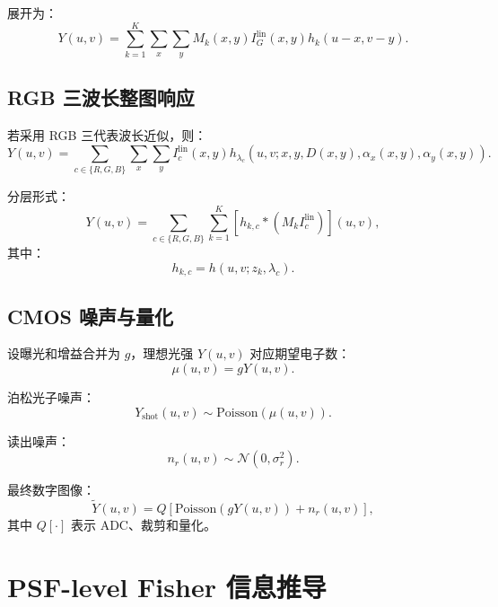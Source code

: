\documentclass[11pt,a4paper,fontset=none]{ctexart}
\begin{document}
展开为：
\begin{equation}
\boxed{
  Y(u,v)
  =
  \sum_{k=1}^{K}
  \sum_x\sum_y
  M_k(x,y)
  I_G^{\mathrm{lin}}(x,y)
  h_k(u-x,v-y).
}
\end{equation}

\subsection{RGB 三波长整图响应}

若采用 RGB 三代表波长近似，则：
\begin{equation}
  Y(u,v)
  =
  \sum_{c\in\{R,G,B\}}
  \sum_x\sum_y
  I_c^{\mathrm{lin}}(x,y)
  h_{\lambda_c}
  \left(
  u,v;
  x,y,
  D(x,y),
  \alpha_x(x,y),
  \alpha_y(x,y)
  \right).
\end{equation}

分层形式：
\begin{equation}
  Y(u,v)
  =
  \sum_{c\in\{R,G,B\}}
  \sum_{k=1}^{K}
  \left[
  h_{k,c}*
  \left(
  M_k I_c^{\mathrm{lin}}
  \right)
  \right](u,v),
\end{equation}
其中：
\begin{equation}
  h_{k,c}=h(u,v;z_k,\lambda_c).
\end{equation}

\subsection{CMOS 噪声与量化}

设曝光和增益合并为 $g$，理想光强 $Y(u,v)$ 对应期望电子数：
\begin{equation}
  \mu(u,v)=gY(u,v).
\end{equation}

泊松光子噪声：
\begin{equation}
  Y_{\mathrm{shot}}(u,v)\sim
  \mathrm{Poisson}(\mu(u,v)).
\end{equation}

读出噪声：
\begin{equation}
  n_r(u,v)\sim \mathcal N(0,\sigma_r^2).
\end{equation}

最终数字图像：
\begin{equation}
  \tilde Y(u,v)
  =
  Q\left[
  \mathrm{Poisson}(gY(u,v))+n_r(u,v)
  \right],
\end{equation}
其中 $Q[\cdot]$ 表示 ADC、裁剪和量化。

\section{PSF-level Fisher 信息推导}
\end{document}
